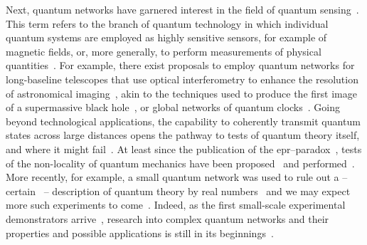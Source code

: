 Next, quantum networks have garnered interest in the field of quantum sensing~\cite{Eldredge2018}.
This term refers to the branch of quantum technology in which individual quantum systems are employed as highly sensitive sensors, for example of magnetic fields, or, more generally, to perform measurements of physical quantities~\cite{Giovannetti2004,Degen2017}.
For example, there exist proposals to employ quantum networks for long-baseline telescopes that use optical interferometry to enhance the resolution of astronomical imaging~\cite{Gottesman2012,Khabiboulline2019}, akin to the techniques used to produce the first image of a supermassive black hole~\cite{TheEventHorizonTelescopeCollaboration2019}, or global networks of quantum clocks~\cite{Komar2014}.
Going beyond technological applications, the capability to coherently transmit quantum states across large distances opens the pathway to tests of quantum theory itself, and where it might fail~\cite{Weinberg1989}.
At least since the publication of the \gls{epr}--paradox~\cite{Einstein1935}, tests of the non-locality of quantum mechanics have been proposed~\cite{Bell1964,Clauser1969} and performed~\cite{Hensen2015,Storz2023}.
More recently, for example, a small quantum network was used to rule out a -- certain~\cite{Hita2025} -- description of quantum theory by real numbers~\cite{Renou2021,Wu2022a,Li2022,Chen2022a} and we may expect more such experiments to come~\cite{Shadbolt2014}.
Indeed, as the first small-scale experimental demonstrators arrive~\cite{Knaut2024,Liu2024,Kucera2024,Stolk2024}, research into complex quantum networks and their properties and possible applications is still in its beginnings~\cite{Nokkala2024}.

